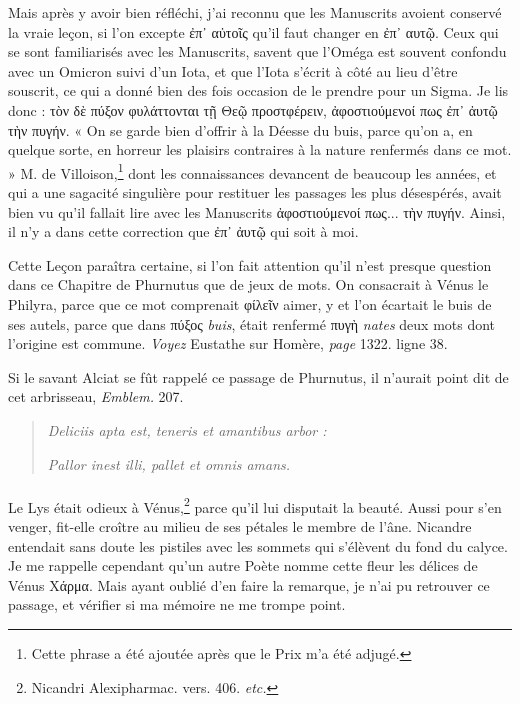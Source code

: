 \documentclass[a4paper, 18pt, oneside]{article}
\begin{document}
Mais après y avoir bien réfléchi, j'ai reconnu que les Manuscrits avoient conservé la vraie leçon, si l'on excepte ἐπ᾽ αὐτοῖς qu'il faut changer en ἐπ᾽ αυτῷ. Ceux qui se sont familiarisés avec les Manuscrits, savent que l'Oméga est souvent confondu avec un Omicron suivi d'un Iota, et que l'Iota s'écrit à côté au lieu d'être souscrit, ce qui a donné bien des fois occasion de le prendre pour un Sigma. Je lis donc : τὸν δὲ πύξον φυλάττονται τῇ Θεῷ προστφέρειν, ἀφοστιούμενοί πως ἐπ᾿ ἀυτῷ τὴν πυγήν. « On se garde bien d'offrir à la Déesse du buis, parce qu'on a, en quelque sorte, en horreur les plaisirs contraires à la nature renfermés dans ce mot. » M. de Villoison,\footnote{Cette phrase a été ajoutée après que le Prix m'a été adjugé.} dont les connaissances devancent de beaucoup les années, et qui a une sagacité singulière pour restituer les passages les plus désespérés, avait bien vu qu'il fallait lire avec les Manuscrits ἀφοστιούμενοί πως... τὴν πυγήν. Ainsi, il n'y a dans cette correction que ἐπ᾿ ἀυτῷ qui soit à moi.

Cette Leçon paraîtra certaine, si l'on fait attention qu'il n'est presque question dans ce Chapitre de Phurnutus que de jeux de mots. On consacrait à Vénus le Philyra, parce que ce mot comprenait φίλεῖν aimer, y et l'on écartait le buis de ses autels, parce que dans πύξος \emph{buis}, était renfermé πυγὴ \emph{nates} deux mots dont l'origine est commune. \emph{Voyez} Eustathe sur Homère, \emph{page} 1322. ligne 38.

Si le savant Alciat se fût rappelé ce passage de Phurnutus, il n'aurait point dit de cet arbrisseau, \emph{Emblem.} 207.
\begin{quotation}
\emph{Deliciis apta est, teneris et amantibus arbor :}

\hspace*{5mm}\emph{Pallor inest illi, pallet et omnis amans.}
\end{quotation}
\paragraph{}
Le Lys était odieux à Vénus,\footnote{Nicandri Alexipharmac. vers. 406. \emph{etc.}} parce qu'il lui disputait la beauté. Aussi pour s'en venger, fit-elle croître au milieu de ses pétales le membre de l'âne. Nicandre entendait sans doute les pistiles avec les sommets qui s'élèvent du fond du calyce. Je me rappelle cependant qu'un autre Poète nomme cette fleur les délices de Vénus Χάρμα. Mais ayant oublié d'en faire la remarque, je n'ai pu retrouver ce passage, et vérifier si ma mémoire ne me trompe point.
\end{document}
